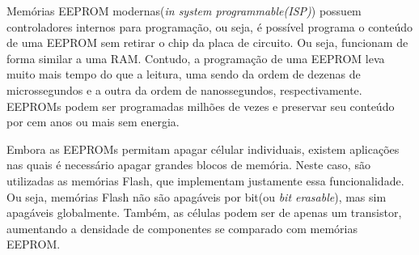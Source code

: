 \documentclass{article}
\begin{document}
Memórias EEPROM modernas(\textit{in system programmable(ISP)}) possuem controladores internos para programação, ou seja, é possível programa o conteúdo de uma EEPROM sem retirar o chip da placa de circuito. Ou seja, funcionam de forma similar a uma RAM. Contudo, a programação de uma EEPROM leva muito mais tempo do que a leitura, uma sendo da ordem de dezenas de microssegundos e a outra da ordem de nanossegundos, respectivamente. EEPROMs podem ser programadas milhões de vezes e preservar seu conteúdo por cem anos ou mais sem energia. 

Embora as EEPROMs permitam apagar célular individuais, existem aplicações nas quais é necessário apagar grandes blocos de memória. Neste caso, são utilizadas as memórias Flash, que implementam justamente essa funcionalidade. Ou seja, memórias Flash não são apagáveis por bit(ou \textit{bit erasable}), mas sim apagáveis globalmente. Também, as células podem ser de apenas um transistor, aumentando a densidade de componentes se comparado com memórias EEPROM.
\end{document}
